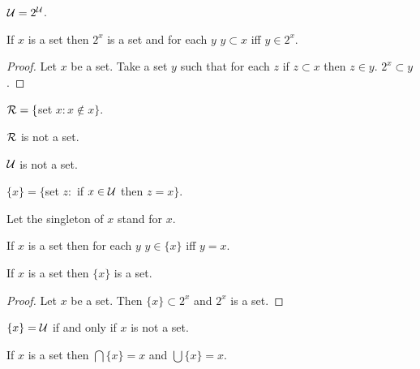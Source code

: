 \documentclass[a4paper,draft]{amsproc}
\begin{document}
\begin{forthel}
\begin{theorem}
$\cal{U} = 2^{\cal{U}}$.
\end{theorem}

\begin{theorem}
If $x$ is a set then $2^{x}$ is a set and for
each $y$  $y \subset x$ iff $y \in 2^{x}$.
\end{theorem}
\begin{proof}
Let $x$ be a set.
Take a set $y$ such that for each $z$ 
if $z \subset x$ then $z \in y$.
$2^{x} \subset y$.
\end{proof}

\begin{definition} $\cal{R} = \{$set $x : x \notin x\}$.\end{definition}

\begin{theorem}
$\cal{R}$ is not a set.
\end{theorem}

\begin{theorem}
$\cal{U}$ is not a set.
\end{theorem}

\begin{definition} $\{x\} = \{$set $z :$ if $x \in \cal{U}$ then $z = x\}$.\end{definition}
Let the singleton of $x$ stand for ${x}$.


\begin{theorem}
If $x$ is a set then for each $y$ $y \in \{x\}$ iff $y = x$.
\end{theorem}

\begin{theorem}
If $x$ is a set then $\{x\}$ is a set.
\end{theorem}
\begin{proof}
Let $x$ be a set. Then $\{x\} \subset 2^{x}$ 
and $2^{x}$ is a set.
\end{proof}

\begin{theorem}
$\{x\} = \cal{U}$ if and only if $x$ is not a set.
\end{theorem}

\begin{theorem}
If $x$ is a set then $\bigcap \{x\} = x$ 
and $\bigcup \{x\} = x$.
\end{theorem}


\end{forthel}
\end{document}
